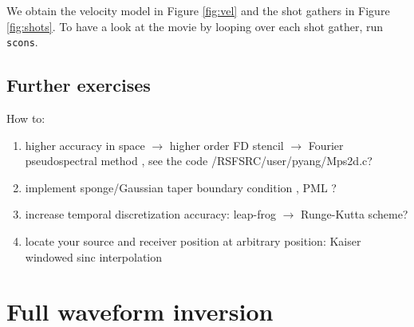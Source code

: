 We obtain the velocity model in Figure \ref{fig:vel} and the shot gathers in Figure \ref{fig:shots}. To have a look at the movie by looping over each shot gather, run \texttt{scons}.






\subsection{Further exercises}
How to:
\begin{enumerate}
 \item higher accuracy in space  $\rightarrow$ higher order FD stencil $\rightarrow$ Fourier pseudospectral method \citep{Carcione_2010_GFP}, see the code /RSFSRC/user/pyang/Mps2d.c? 
 \item implement sponge/Gaussian taper boundary condition \citep{Cerjan_1985_NBC}, PML \citep{Komatitsch_2007_GEO}? \citep{Yang_2014_NTW}
 \item increase temporal discretization accuracy: leap-frog $\rightarrow$ Runge-Kutta scheme?
 \item locate your source and receiver position at arbitrary position: Kaiser windowed sinc interpolation \citep{Hicks_2002_ASR}
\end{enumerate}


\section{Full waveform inversion}


